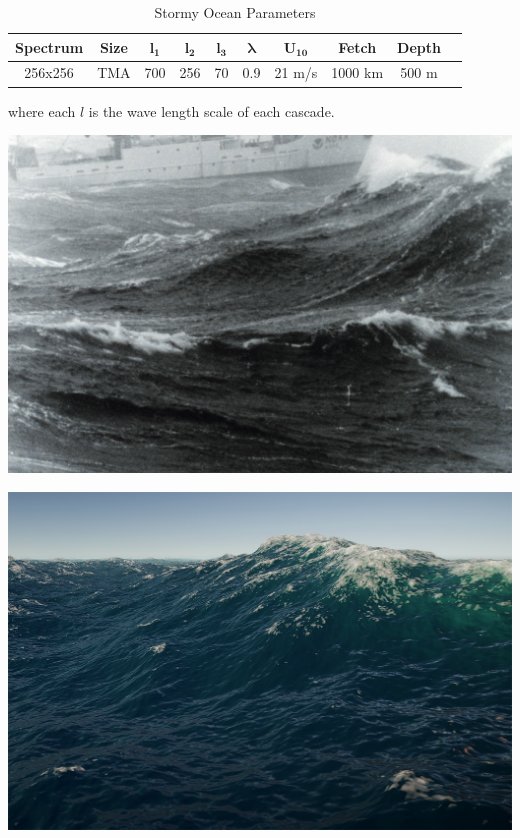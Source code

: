\begin{table}[h]
    \centering
    \begin{tabular}{|c|c|c|c|c|c|c|c|c|c|}
        \hline
        \textbf{Spectrum} & \textbf{Size} & $\mathbf{l_1}$ & $\mathbf{l_2}$ & $\mathbf{l_3}$ & $\mathbf{\lambda}$ & $\mathbf{U_{10}}$ & \textbf{Fetch} & \textbf{Depth} \\
        \hline
        256x256 & TMA & 700 & 256 & 70 & 0.9 & 21 m/s & 1000 km & 500 m \\
        \hline
    \end{tabular}
    \caption{Stormy Ocean Parameters}
    \label{tab:stormy_ocean}
\end{table}

where each $l$ is the wave length scale of each cascade.

\begin{minipage}{0.48\textwidth}
    \centering
    \includegraphics[width=1\textwidth]{"images/real_stormy_ocean.png"}
    \captionsetup{justification=centering}
    \label{fig:real_stormy_ocean}
\end{minipage}
\hfill
\begin{minipage}{0.48\textwidth}
    \centering
    \includegraphics[width=1\textwidth]{"images/fake_stormy_ocean.png"}
    \label{fig:fake_stormy_ocean}
\end{minipage}

